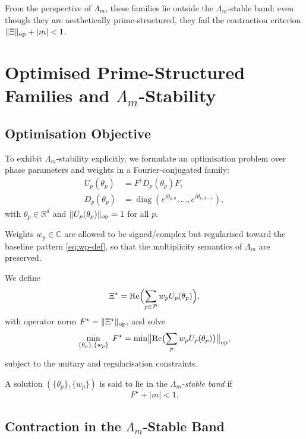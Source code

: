 \documentclass[11pt,letterpaper]{article}
\begin{document}
From the perspective of \(\Lambda_m\), these families lie outside the
\(\Lambda_m\)-stable band: even though they are aesthetically
prime-structured, they fail the contraction criterion
\(\|\Xi\|_{\rm op} + |m| < 1\).

\section{Optimised Prime-Structured Families and \(\Lambda_m\)-Stability}

\subsection{Optimisation Objective}

To exhibit \(\Lambda_m\)-stability explicitly, we formulate
an optimisation problem over phase parameters and weights in a
Fourier-conjugated family:
\begin{align}
  U_p(\theta_p) &= F^\dagger D_p(\theta_p) F, \\
  D_p(\theta_p) &= \operatorname{diag}(e^{i\theta_{p,0}},\dots,e^{i\theta_{p,d-1}}),
\end{align}
with \(\theta_p \in \mathbb{R}^d\) and \(\|U_p(\theta_p)\|_{\rm op}=1\)
for all \(p\).

Weights \(w_p \in \mathbb{C}\) are allowed to be signed/complex but
regularised toward the baseline pattern \eqref{eq:wp-def},
so that the multiplicity semantics of \(\Lambda_m\) are preserved.

We define
\begin{equation}
  \Xi^\star = \operatorname{Re}\Bigl(\sum_{p\in\mathcal{P}} w_p U_p(\theta_p)\Bigr),
\end{equation}
with operator norm \(F^\star = \|\Xi^\star\|_{\rm op}\), and solve
\begin{equation}
  \min_{\{\theta_p\},\{w_p\}} \; F^\star
  = \min \bigl\|\operatorname{Re}\bigl(\sum_p w_p U_p(\theta_p)\bigr)\bigr\|_{\rm op},
\end{equation}
subject to the unitary and regularisation constraints.

A solution \((\{\theta_p\},\{w_p\})\) is said to lie in the
\emph{\(\Lambda_m\)-stable band} if
\begin{equation}
  F^\star + |m| < 1.
  \label{eq:lambda-m-stable}
\end{equation}

\subsection{Contraction in the \(\Lambda_m\)-Stable Band}
\end{document}
